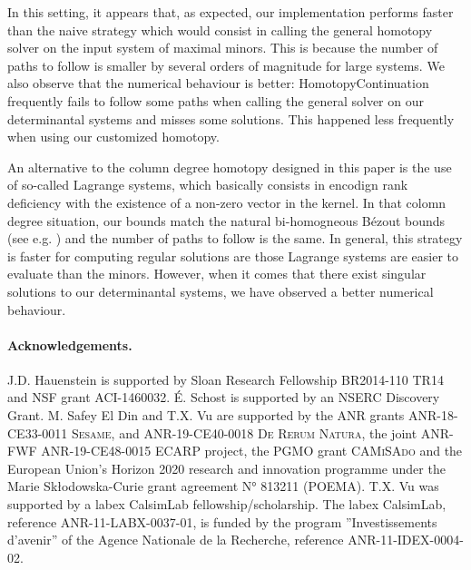 \documentclass[amsthm]{elsart}
\begin{document}
In this setting, it appears that, as expected, our implementation performs
faster than the naive strategy which would consist in calling the general
homotopy solver on the input system of maximal minors. This is because the
number of paths to follow is smaller by several orders of magnitude for large
systems. We also observe that the numerical behaviour is better: {\sf
  HomotopyContinuation} frequently fails to follow some paths when calling the
general solver on our determinantal systems and misses some solutions. This
happened less frequently when using our customized homotopy.

An alternative to the column degree homotopy designed in this paper is the use
of so-called Lagrange systems, which basically consists in encodign rank
deficiency with the existence of a non-zero vector in the kernel. In that colomn
degree situation, our bounds match the natural bi-homogneous B\'ezout bounds
(see e.g. \cite{SaSc16}) and the number of paths to follow is the same. In
general, this strategy is faster for computing regular solutions are those
Lagrange systems are easier to evaluate than the minors. However, when it comes
that there exist singular solutions to our determinantal systems, we have
observed a better numerical behaviour.

\paragraph*{Acknowledgements.} J.D. Hauenstein is supported by Sloan Research
Fellowship BR2014-110 TR14 and NSF grant ACI-1460032. \'E. Schost is supported
by an NSERC Discovery Grant. M. Safey El Din and T.X. Vu are supported
by the ANR grants ANR-18-CE33-0011 \textsc{Sesame}, and ANR-19-CE40-0018
\textsc{De Rerum Natura}, the joint ANR-FWF ANR-19-CE48-0015 \textsc{ECARP}
project, the PGMO grant \textsc{CAMiSAdo} and the European Union’s Horizon 2020
research and innovation programme under the Marie Skłodowska-Curie grant
agreement N° 813211 (POEMA). T.X. Vu was supported by a labex CalsimLab
fellowship/scholarship. The labex CalsimLab, reference ANR-11-LABX-0037-01, is
funded by the program ''Investissements d'avenir'' of the Agence Nationale de la
Recherche, reference ANR-11-IDEX-0004-02.

\vspace{-0.5cm}


\appendix
\end{document}
